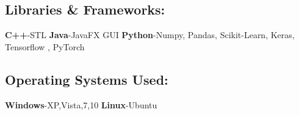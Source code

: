 \documentclass{article}
\begin{document}
\subsection*{Libraries \& Frameworks:}
\textbf{C++}-STL
\textbf{Java}-JavaFX GUI
\textbf{Python}-Numpy, Pandas, Scikit-Learn, Keras, Tensorflow , PyTorch
\subsection*{Operating Systems Used:}
\textbf{Windows}-XP,Vista,7,10
\textbf{Linux}-Ubuntu
\end{document}
